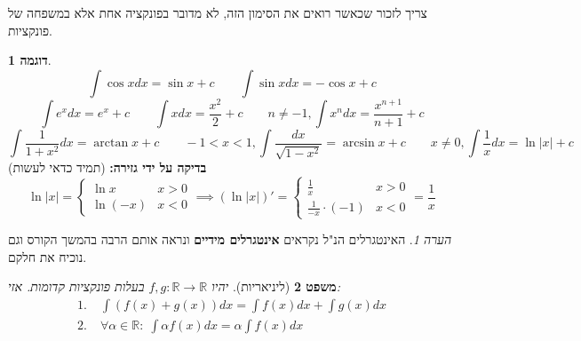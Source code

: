 \documentclass[12pt]{article}
\let\oldint\int
\renewcommand{\int}{\oldint\limits}
\theoremstyle{plain}
\newtheorem{theorem}{משפט}[section]      %
\theoremstyle{definition}
\newtheorem{example}[theorem]{דוגמה}      %
\theoremstyle{remark}
\newtheorem*{remark}{הערה}                %
\begin{document}
צריך לזכור שכאשר רואים את הסימון הזה, לא מדובר בפונקציה אחת אלא במשפחה של פונקציות.\begin{example}
\[
{\int \cos xdx=\sin x+c \qquad \int \sin xdx=-\cos x+c}
\]
\[
{\int e^xdx=e^x+c \qquad \int xdx=\frac{x^2}{2}+c \qquad n\neq-1, \int x^ndx=\frac{x^{n+1}}{n+1}+c}
\]
\[
{\int \frac{1}{1+x^2}dx=\arctan x+c \qquad -1<x<1, \int \frac{dx}{\sqrt{ 1-x^2 }}=\arcsin x+c \qquad x\neq0,\int \frac{1}{x}dx=\ln |x|+c}
\]
\textbf{בדיקה על ידי גזירה:} (תמיד כדאי לעשות)\[
{\ln |x|=\begin{cases}
\ln x  & x> 0 \\
\ln(-x) & x<0
\end{cases} \implies (\ln |x|)'=\begin{cases}
\frac{1}{x} & x> 0 \\
 \frac{1}{-x}\cdot (-1) & x<0
\end{cases}=\frac{1}{x}}
\]
\begin{remark}
האינטגרלים הנ"ל נקראים \textbf{אינטגרלים מידיים} ונראה אותם הרבה בהמשך הקורס וגם נוכיח את חלקם.
\end{remark}

\end{example}
\begin{theorem}[ליניאריות]
יהיו \({f,g:\mathbb{R}\to \mathbb{R}}\) בעלות פונקציות קדומות. אזי:\[
{\begin{aligned}
1.\; & \int (f(x)+g(x))dx=\int f(x)dx+\int g(x)dx \\
2.\; & \forall \alpha \in \mathbb{R}:\; \int \alpha f(x)dx=\alpha\int f(x)dx
\end{aligned}}
\]

\end{theorem}
\end{document}
